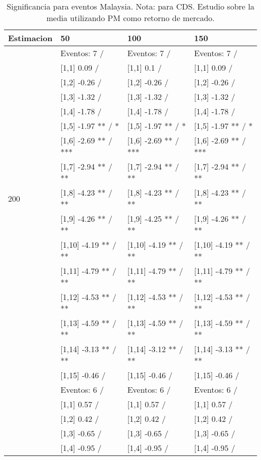 \begin{table}

\caption{Significancia para eventos Malaysia. Nota: para CDS. Estudio sobre la media utilizando PM como retorno de mercado.}
\centering
\begin{tabular}[t]{llll}
\toprule
Estimacion & 50 & 100 & 150\\
\midrule
 & Eventos:  7 / & Eventos:  7 / & Eventos:  7 /\\
 & {}[1,1] 0.09  / & {}[1,1] 0.1  / & {}[1,1] 0.09  /\\
 & {}[1,2] -0.26  / & {}[1,2] -0.26  / & {}[1,2] -0.26  /\\
 & {}[1,3] -1.32  / & {}[1,3] -1.32  / & {}[1,3] -1.32  /\\
 & {}[1,4] -1.78  / & {}[1,4] -1.78  / & {}[1,4] -1.78  /\\
\addlinespace
 & {}[1,5] -1.97 ** / * & {}[1,5] -1.97 ** / * & {}[1,5] -1.97 ** / *\\
 & {}[1,6] -2.69 ** / *** & {}[1,6] -2.69 ** / *** & {}[1,6] -2.69 ** / ***\\
 & {}[1,7] -2.94 ** / ** & {}[1,7] -2.94 ** / ** & {}[1,7] -2.94 ** / **\\
200 & {}[1,8] -4.23 ** / ** & {}[1,8] -4.23 ** / ** & {}[1,8] -4.23 ** / **\\
 & {}[1,9] -4.26 ** / ** & {}[1,9] -4.25 ** / ** & {}[1,9] -4.26 ** / **\\
\addlinespace
 & {}[1,10] -4.19 ** / ** & {}[1,10] -4.19 ** / ** & {}[1,10] -4.19 ** / **\\
 & {}[1,11] -4.79 ** / ** & {}[1,11] -4.79 ** / ** & {}[1,11] -4.79 ** / **\\
 & {}[1,12] -4.53 ** / ** & {}[1,12] -4.53 ** / ** & {}[1,12] -4.53 ** / **\\
 & {}[1,13] -4.59 ** / ** & {}[1,13] -4.59 ** / ** & {}[1,13] -4.59 ** / **\\
 & {}[1,14] -3.13 ** / ** & {}[1,14] -3.12 ** / ** & {}[1,14] -3.13 ** / **\\
\addlinespace
 & {}[1,15] -0.46  / & {}[1,15] -0.46  / & {}[1,15] -0.46  /\\
 & Eventos:  6 / & Eventos:  6 / & Eventos:  6 /\\
 & {}[1,1] 0.57  / & {}[1,1] 0.57  / & {}[1,1] 0.57  /\\
 & {}[1,2] 0.42  / & {}[1,2] 0.42  / & {}[1,2] 0.42  /\\
 & {}[1,3] -0.65  / & {}[1,3] -0.65  / & {}[1,3] -0.65  /\\
\addlinespace
 & {}[1,4] -0.95  / & {}[1,4] -0.95  / & {}[1,4] -0.95  /\\

\end{tabular}
\end{table}
